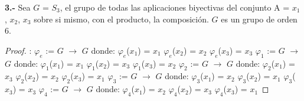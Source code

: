 \documentclass[10pt,a4paper,oneside]{article}
\begin{document}
				\newline
				\newline
				\textbf{3.-} Sea $G$ = $S_{3}$, el grupo de todas las aplicaciones biyectivas del conjunto A = {$x_{1}$, $x_{2}$, $x_{3}$} sobre si mismo, con el producto, la composición. $G$ es un grupo de orden 6.
				\begin{proof}:
					\newline
					\newline
					$\varphi_{e}$ := $G$ $\rightarrow$ $G$ donde:
					\newline
					$\varphi_{e}$($x_{1}$) = $x_{1}$
					\newline
					$\varphi_{e}$($x_{2}$) = $x_{2}$
					\newline
					$\varphi_{e}$($x_{3}$) = $x_{3}$
					\newline
					\newline
					$\varphi_{1}$ := $G$ $\rightarrow$ $G$ donde:
					\newline
					$\varphi_{1}$($x_{1}$) = $x_{1}$
					\newline
					$\varphi_{1}$($x_{2}$) = $x_{3}$
					\newline
					$\varphi_{1}$($x_{3}$) = $x_{2}$
					\newline
					\newline
					$\varphi_{2}$ := $G$ $\rightarrow$ $G$ donde:
					\newline
					$\varphi_{2}$($x_{1}$) = $x_{3}$
					\newline
					$\varphi_{2}$($x_{2}$) = $x_{2}$
					\newline
					$\varphi_{2}$($x_{3}$) = $x_{1}$
					\newline
					\newline
					$\varphi_{3}$ := $G$ $\rightarrow$ $G$ donde:
					\newline
					$\varphi_{3}$($x_{1}$) = $x_{2}$
					\newline
					$\varphi_{3}$($x_{2}$) = $x_{1}$
					\newline
					$\varphi_{3}$($x_{3}$) = $x_{3}$
					\newline
					\newline
					$\varphi_{4}$ := $G$ $\rightarrow$ $G$ donde:
					\newline
					$\varphi_{4}$($x_{1}$) = $x_{2}$
					\newline
					$\varphi_{4}$($x_{2}$) = $x_{3}$
					\newline
					$\varphi_{4}$($x_{3}$) = $x_{1}$
					\newline
					\newline

\end{proof}
\end{document}
